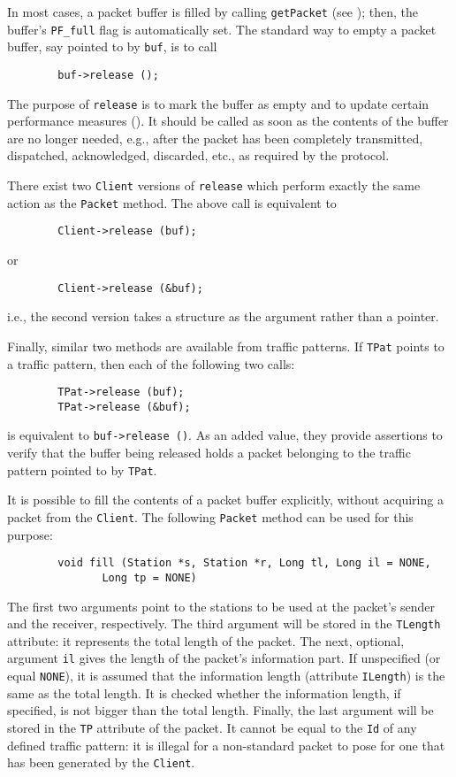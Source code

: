 In most cases, a packet buffer is filled by calling {\tt getPacket}
(see ); then,
the buffer's {\tt PF\_full} flag is automatically set.
The standard way to empty a packet buffer, say pointed to by {\tt buf},
is to call
\begin{verbatim}
        buf->release ();
\end{verbatim}
\noindent
The purpose of {\tt release} is to mark the buffer as empty and to update
certain performance measures ().
It should be called as soon as the contents of the buffer are no longer
needed, e.g., after the packet has been completely transmitted, dispatched,
acknowledged, discarded, etc., as required by the protocol.

There exist two {\tt Client} versions of {\tt release} which perform exactly
the same action as the {\tt Packet} method.
The above call is equivalent to
\begin{verbatim}
        Client->release (buf);
\end{verbatim}
or
\begin{verbatim}
        Client->release (&buf);
\end{verbatim}
i.e., the second version takes a structure as the argument rather than a
pointer.

Finally, similar two methods are available from traffic patterns.
If {\tt TPat} points to a traffic pattern, then each of the following two calls:
\begin{verbatim}
        TPat->release (buf);
        TPat->release (&buf);
\end{verbatim}
is equivalent to {\tt buf->release~()}.
As an added value, they provide assertions to verify that
the buffer being released holds a packet belonging to the traffic pattern
pointed to by {\tt TPat}.

It is possible to fill the contents of a packet buffer explicitly, without
acquiring a packet from the {\tt Client}.
The following {\tt Packet} method can be used for this purpose:
\begin{verbatim}
        void fill (Station *s, Station *r, Long tl, Long il = NONE,
               Long tp = NONE)
\end{verbatim}
\noindent
The first two arguments point to the stations to be used at the packet's
sender and the receiver, respectively.
The third argument will be stored in the {\tt TLength} attribute: it
represents the total length of the packet.
The next, optional, argument {\tt il} gives the length of the packet's
information part.
If unspecified (or equal {\tt NONE}), it is assumed that the information
length (attribute {\tt ILength}) is the same as the total length.
It is checked whether the information length, if specified,
is not bigger than the total length.
Finally, the last argument will be stored in the {\tt TP} attribute of
the packet.
It cannot be equal to the {\tt Id} of any defined traffic pattern:
it is illegal for a non-standard packet to pose for one that has been
generated by the {\tt Client}.

